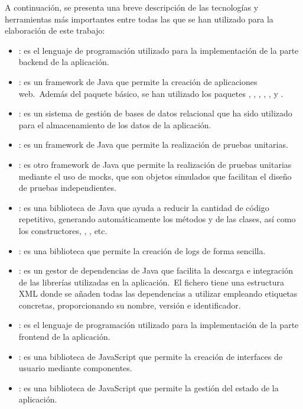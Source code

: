 A continuación, se presenta una breve descripción de las tecnologías y herramientas más importantes entre todas las que
se han utilizado para la elaboración de este trabajo:

\begin{itemize}
	\item {}: es el lenguaje de programación utilizado para la implementación de la parte backend de la
	aplicación.
	\item {}: es un framework de Java que permite la creación de aplicaciones web.\ Además del
	paquete básico, se han utilizado los paquetes , ,
	, , , y .
	\item {}: es un sistema de gestión de bases de datos relacional que ha sido utilizado para el
	almacenamiento de los datos de la aplicación.
	\item {}: es un framework de Java que permite la realización de pruebas unitarias.
	\item {}: es otro framework de Java que permite la realización de pruebas unitarias mediante el uso
	de mocks, que son objetos simulados que facilitan el diseño de pruebas independientes.
	\item {}: es una biblioteca de Java que ayuda a reducir la cantidad de código repetitivo,
	generando automáticamente los métodos  y  de las clases, así como los
	constructores, , , etc.
	\item {}: es una biblioteca que permite la creación de logs de forma sencilla.
	\item {}: es un gestor de dependencias de Java que facilita la descarga e integración de las
	librerías utilizadas en la aplicación.\ El fichero  tiene una estructura XML donde se añaden
	todas las dependencias a utilizar empleando etiquetas concretas, proporcionando su nombre, versión e identificador.
	\item {}: es el lenguaje de programación utilizado para la implementación de la parte frontend
	de la aplicación.
	\item {}: es una biblioteca de JavaScript que permite la creación de interfaces de usuario mediante
	componentes.
	\item {}: es una biblioteca de JavaScript que permite la gestión del estado de la aplicación.

\end{itemize}
